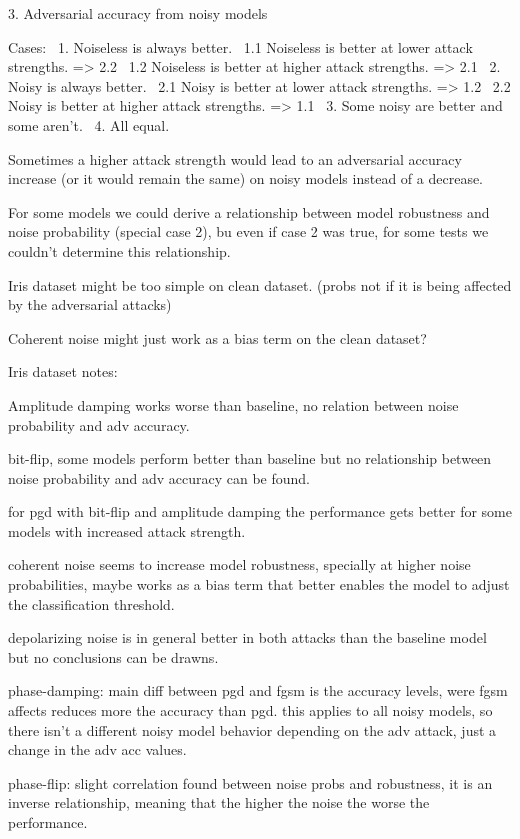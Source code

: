 3. Adversarial accuracy from noisy models \

Cases: \
1. Noiseless is always better. \
  1.1 Noiseless is better at lower attack strengths.  => 2.2 \
  1.2 Noiseless is better at higher attack strengths. => 2.1 \
2. Noisy is always better. \
  2.1 Noisy is better at lower attack strengths.  => 1.2 \
  2.2 Noisy is better at higher attack strengths. => 1.1 \
3. Some noisy are better and some aren't. \
4. All equal. \

Sometimes a higher attack strength would lead to an adversarial
accuracy increase (or it would remain the same) on noisy
models instead of a decrease. \ 

For some models we could derive a relationship between
model robustness and noise probability (special case 2), bu
even if case 2 was true, for some tests we couldn't determine
this relationship. \

\iffalse

Iris dataset might be too simple on clean dataset. (probs not if it is being affected by the adversarial attacks)

Coherent noise might just work as a bias term on the clean dataset? \

Iris dataset notes: \

Amplitude damping works worse than baseline, no relation between noise
probability and adv accuracy. \

bit-flip, some models perform better than baseline but no relationship
between noise probability and adv accuracy can be found. \

for pgd with bit-flip and amplitude damping the performance gets better
for some models with increased attack strength. \

coherent noise seems to increase model robustness, specially at higher noise
probabilities, maybe works as a bias term that better enables the model
to adjust the classification threshold. \

depolarizing noise is in general better in both attacks than the baseline
model but no conclusions can be drawns. \

phase-damping: main diff between pgd and fgsm is the accuracy levels,
were fgsm affects reduces more the accuracy than pgd. this applies to
all noisy models, so there isn't a different noisy model behavior
depending on the adv attack, just a change in the adv acc values. \

phase-flip: slight correlation found between noise probs and robustness,
it is an inverse relationship, meaning that the higher the noise the worse
the performance.

